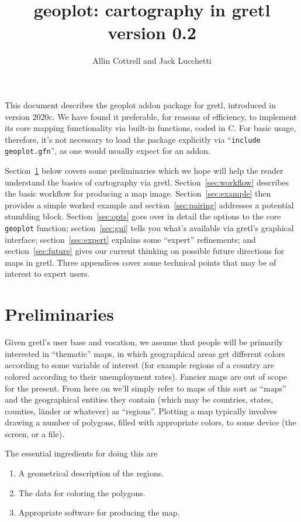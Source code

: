 \documentclass{article}
\title{geoplot: cartography in gretl\\ version 0.2}
\author{Allin Cottrell and Jack Lucchetti}
\begin{document}
\maketitle

This document describes the \textsf{geoplot} addon package for gretl,
introduced in version 2020c. We have found it preferable, for reasons
of efficiency, to implement its core mapping functionality via
built-in functions, coded in C. For basic usage, therefore, it's not
necessary to load the package explicitly via ``\texttt{include
  geoplot.gfn}'', as one would usually expect for an addon.

Section~\ref{sec:prelim} below covers some preliminaries which we hope
will help the reader understand the basics of cartography via
gretl. Section~\ref{sec:workflow} describes the basic workflow for
producing a map image. Section~\ref{sec:example} then provides a
simple worked example and section~\ref{sec:pairing} addresses a
potential stumbling block. Section~\ref{sec:opts} goes over in detail
the options to the core \texttt{geoplot} function;
section~\ref{sec:gui} tells you what's available via gretl's graphical
interface; section~\ref{sec:expert} explains some ``expert''
refinements; and section~\ref{sec:future} gives our current thinking
on possible future directions for maps in gretl. Three appendices
cover some technical points that may be of interest to expert users.

\section{Preliminaries}
\label{sec:prelim}

Given gretl's user base and vocation, we assume that people will be
primarily interested in ``thematic'' maps, in which geographical areas
get different colors according to some variable of interest (for
example regions of a country are colored according to their
unemployment rates). Fancier maps are out of scope for the
present. From here on we'll simply refer to maps of this sort as
``maps'' and the geographical entities they contain (which may be
countries, states, counties, l\"ander or whatever) as
``regions''. Plotting a map typically involves drawing a number of
polygons, filled with appropriate colors, to some device (the screen,
or a file).

The essential ingredients for doing this are
\begin{enumerate}
   \item A geometrical description of the regions.
   \item The data for coloring the polygons.
   \item Appropriate software for producing the map.
\end{enumerate}
\end{document}
